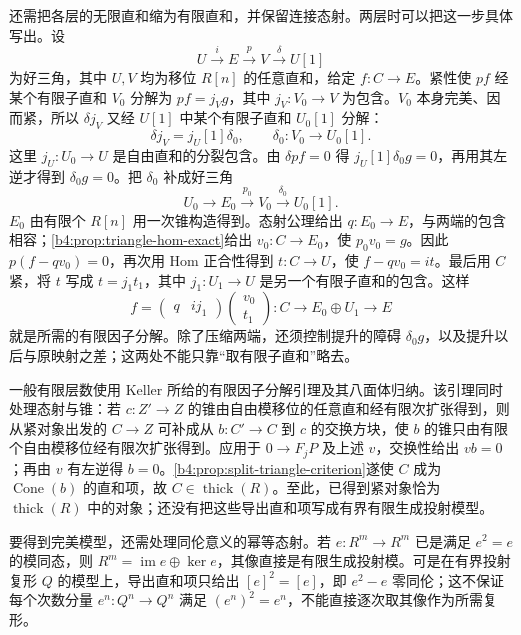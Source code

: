 \begin{proofsketch}
	还需把各层的无限直和缩为有限直和，并保留连接态射。两层时可以把这一步具体写出。设
	\[
		U\xrightarrow{i}E\xrightarrow{p}V\xrightarrow{\delta}U[1]
	\]
	为好三角，其中 \(U,V\) 均为移位 \(R[n]\) 的任意直和，给定 \(f:C\to E\)。紧性使 \(pf\) 经某个有限子直和 \(V_0\) 分解为 \(pf=j_Vg\)，其中 \(j_V:V_0\to V\) 为包含。\(V_0\) 本身完美、因而紧，所以 \(\delta j_V\) 又经 \(U[1]\) 中某个有限子直和 \(U_0[1]\) 分解：
	\[
		\delta j_V=j_U[1]\delta_0, \qquad \delta_0:V_0\longrightarrow U_0[1].
	\]
	这里 \(j_U:U_0\to U\) 是自由直和的分裂包含。由 \(\delta pf=0\) 得 \(j_U[1]\delta_0g=0\)，再用其左逆才得到 \(\delta_0g=0\)。把 \(\delta_0\) 补成好三角
	\[
		U_0\longrightarrow E_0\xrightarrow{p_0}V_0 \xrightarrow{\delta_0}U_0[1].
	\]
	\(E_0\) 由有限个 \(R[n]\) 用一次锥构造得到。态射公理给出 \(q:E_0\to E\)，与两端的包含相容；\cref{b4:prop:triangle-hom-exact}给出 \(v_0:C\to E_0\)，使 \(p_0v_0=g\)。因此 \(p(f-qv_0)=0\)，再次用 Hom 正合性得到 \(t:C\to U\)，使 \(f-qv_0=it\)。最后用 \(C\) 紧，将 \(t\) 写成 \(t=j_1t_1\)，其中 \(j_1:U_1\to U\) 是另一个有限子直和的包含。这样
	\[
		f=\begin{pmatrix}q&ij_1\end{pmatrix}
		\begin{pmatrix}v_0\\t_1\end{pmatrix}
		:C\longrightarrow E_0\oplus U_1\longrightarrow E
	\]
	就是所需的有限因子分解。除了压缩两端，还须控制提升的障碍 \(\delta_0g\)，以及提升以后与原映射之差；这两处不能只靠“取有限子直和”略去。

	一般有限层数使用 Keller \cite[Section 5.3, Lemma]{Keller1994DerivingDG}所给的有限因子分解引理及其八面体归纳。该引理同时处理态射与锥：若 \(c:Z'\to Z\) 的锥由自由模移位的任意直和经有限次扩张得到，则从紧对象出发的 \(C\to Z\) 可补成从 \(b:C'\to C\) 到 \(c\) 的交换方块，使 \(b\) 的锥只由有限个自由模移位经有限次扩张得到。应用于 \(0\to F_jP\) 及上述 \(v\)，交换性给出 \(vb=0\)；再由 \(v\) 有左逆得 \(b=0\)。\cref{b4:prop:split-triangle-criterion}遂使 \(C\) 成为 \(\operatorname{Cone}(b)\) 的直和项，故 \(C\in\operatorname{thick}(R)\)。至此，已得到紧对象恰为 \(\operatorname{thick}(R)\) 中的对象；还没有把这些导出直和项写成有界有限生成投射模型。

	要得到完美模型，还需处理同伦意义的幂等态射。若 \(e:R^m\to R^m\) 已是满足 \(e^2=e\) 的模同态，则 \(R^m=\operatorname{im}e\oplus\ker e\)，其像直接是有限生成投射模。可是在有界投射复形 \(Q\) 的模型上，导出直和项只给出 \([e]^2=[e]\)，即 \(e^2-e\) 零同伦；这不保证每个次数分量 \(e^n:Q^n\to Q^n\) 满足 \((e^n)^2=e^n\)，不能直接逐次取其像作为所需复形。


\end{proofsketch}
